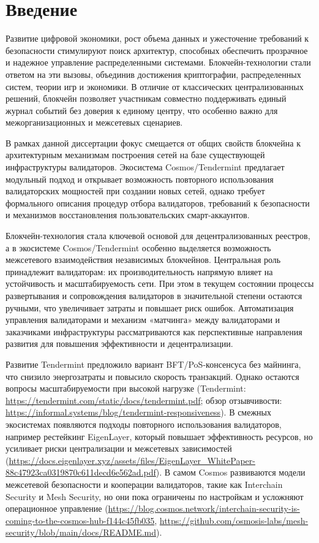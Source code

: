 \chapter*{Введение}                         %

Развитие цифровой экономики, рост объема данных и ужесточение требований к
безопасности стимулируют поиск архитектур, способных обеспечить прозрачное и
надежное управление распределенными системами. Блокчейн-технологии стали ответом
на эти вызовы, объединив достижения криптографии, распределенных систем, теории
игр и экономики. В отличие от классических централизованных решений, блокчейн
позволяет участникам совместно поддерживать единый журнал событий без доверия к
единому центру, что особенно важно для межорганизационных и межсетевых сценариев.

В рамках данной диссертации фокус смещается от общих свойств блокчейна к
архитектурным механизмам построения сетей на базе существующей инфраструктуры
валидаторов. Экосистема Cosmos/Tendermint предлагает модульный подход и открывает
возможность повторного использования валидаторских мощностей при создании новых
сетей, однако требует формального описания процедур отбора валидаторов,
требований к безопасности и механизмов восстановления пользовательских
смарт-аккаунтов.

Блокчейн-технология стала ключевой основой для децентрализованных реестров, а в
экосистеме Cosmos/Tendermint особенно выделяется возможность межсетевого
взаимодействия независимых блокчейнов. Центральная роль принадлежит валидаторам:
их производительность напрямую влияет на устойчивость и масштабируемость сети.
При этом в текущем состоянии процессы развертывания и сопровождения валидаторов
в значительной степени остаются ручными, что увеличивает затраты и повышает риск
ошибок. Автоматизация управления валидаторами и механизм «матчинга» между
валидаторами и заказчиками инфраструктуры рассматриваются как перспективные
направления развития для повышения эффективности и децентрализации.

Развитие Tendermint предложило вариант BFT/PoS-консенсуса без майнинга, что
снизило энергозатраты и повысило скорость транзакций. Однако остаются вопросы
масштабируемости при высокой нагрузке (Tendermint: \url{https://tendermint.com/static/docs/tendermint.pdf};
обзор отзывчивости: \url{https://informal.systems/blog/tendermint-responsiveness}).
В смежных экосистемах появляются подходы повторного использования валидаторов,
например рестейкинг EigenLayer, который повышает эффективность ресурсов, но
усиливает риски централизации и межсетевых зависимостей
(\url{https://docs.eigenlayer.xyz/assets/files/EigenLayer_WhitePaper-88c47923ca0319870c611decd6e562ad.pdf}).
В самом Cosmos развиваются модели межсетевой безопасности и кооперации валидаторов,
такие как Interchain Security и Mesh Security, но они пока ограничены по
настройкам и усложняют операционное управление
(\url{https://blog.cosmos.network/interchain-security-is-coming-to-the-cosmos-hub-f144c45fb035},
\url{https://github.com/osmosis-labs/mesh-security/blob/main/docs/README.md}).


